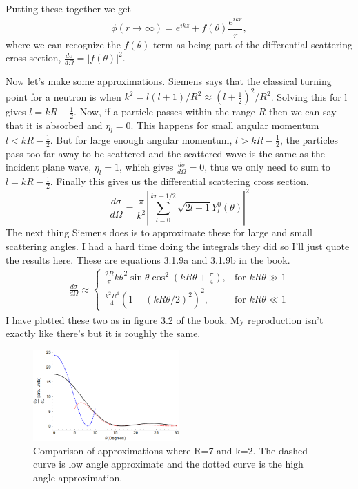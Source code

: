 \documentclass[12pt]{extarticle}
\begin{document}
Putting these together we get
\begin{equation}
   \phi(r\rightarrow\infty) = e^{ikz} + f(\theta)\frac{e^{ikr}}{r},
\end{equation}
where we can recognize the $f(\theta)$ term as being part of the differential scattering cross section, $\frac{d\sigma}{d\Omega} = \left|f(\theta)\right|^2$.

Now let's make some approximations. Siemens says that the classical turning point for a neutron is when $k^2 = l(l+1)/R^2 \approx (l+\frac{1}{2})^2/R^2$. Solving this for l gives $l=kR-\frac{1}{2}$. Now, if a particle passes within the range $R$ then we can say that it is absorbed and $\eta_l=0$. This happens for small angular momentum $l < kR-\frac{1}{2}$. But for large enough angular momentum, $l > kR - \frac{1}{2}$, the particles pass too far away to be scattered and the scattered wave is the same as the incident plane wave, $\eta_l=1$, which gives $\frac{d\sigma}{d\Omega} = 0$, thus we only need to sum to $l=kR-\frac{1}{2}$. Finally this gives us the differential scattering cross section.
\begin{equation}
   \frac{d\sigma}{d\Omega} = \frac{\pi}{k^2} \left|\sum\limits_{l=0}^{kr-1/2} \sqrt{2l+1} Y_l^0(\theta)\right|^2
\end{equation}
The next thing Siemens does is to approximate these for large and small scattering angles. I had a hard time doing the integrals they did so I'll just quote the results here. These are equations 3.1.9a and 3.1.9b in the book.
\begin{align}
   \frac{d\sigma}{d\Omega} \approx
\begin{cases}
   \frac{2R}{\pi} k\theta^2 \sin\theta\cos^2\left(kR\theta+\frac{\pi}{4}\right),& \text{for } kR\theta \gg 1 \\
   \frac{k^2R^4}{4}(1-(kR\theta/2)^2)^2,& \text{for } kR\theta \ll 1
\end{cases}
\label{eq:crossapprox}
\end{align}
I have plotted these two as in figure 3.2 of the book. My reproduction isn't exactly like there's but it is roughly the same.
\begin{figure}[h]
   \centering
   \includegraphics[width=0.5\textwidth]{fig3_2.png}
   \caption{Comparison of approximations where R=7 and k=2. The dashed curve is low angle approximate and the dotted curve is the high angle approximation.}
\end{figure}
\end{document}
